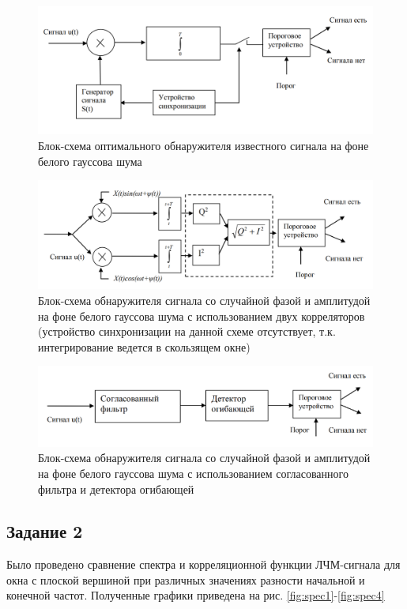 \begin{figure}[h!]
	\centering
	\includegraphics[width =0.8\linewidth]{imgs/scheme1.png}
	\caption{Блок-схема оптимального обнаружителя известного сигнала на фоне белого гауссова
    шума}
	\label{fig:scheme1}
\end{figure}

\begin{figure}[h!]
	\centering
	\includegraphics[width =0.8\linewidth]{imgs/scheme2.png}
	\caption{Блок-схема обнаружителя сигнала со случайной фазой и амплитудой на фоне белого
    гауссова шума с использованием двух корреляторов (устройство синхронизации на данной
    схеме отсутствует, т.к. интегрирование ведется в скользящем окне)
    }
	\label{fig:scheme2}
\end{figure}

\begin{figure}[h!]
	\centering
	\includegraphics[width =0.8\linewidth]{imgs/scheme3.png}
	\caption{Блок-схема обнаружителя сигнала со случайной фазой и амплитудой на фоне
    белого гауссова шума с использованием согласованного фильтра и детектора огибающей}
	\label{fig:scheme3}
\end{figure}

\subsection{Задание 2}
Было проведено сравнение спектра и корреляционной функции ЛЧМ-сигнала для окна с
плоской вершиной при различных значениях разности начальной и
конечной частот. Полученные графики приведена на рис. \ref{fig:spec1}-\ref{fig:spec4}

